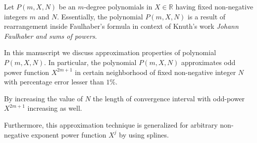 Let $P(m, X, N)$ be an $m$-degree polynomials in $X\in\mathbb{R}$
having fixed non-negative integers $m$ and $N$.
Essentially, the polynomial $P(m, X, N)$ is a result of rearrangement inside Faulhaber's formula
in context of Knuth's work \textit{Johann Faulhaber and sums of powers}.

In this manuscript we discuss approximation properties of polynomial $P(m,X,N)$.
In particular, the polynomial $P(m,X,N)$ approximates odd power function $X^{2m+1}$ in certain neighborhood
of fixed non-negative integer $N$ with percentage error lesser than $1\%$.

By increasing the value of $N$ the length of convergence interval with odd-power $X^{2m+1}$ increasing as well.

Furthermore, this approximation technique is generalized for arbitrary non-negative exponent power function $X^j$
by using splines.

